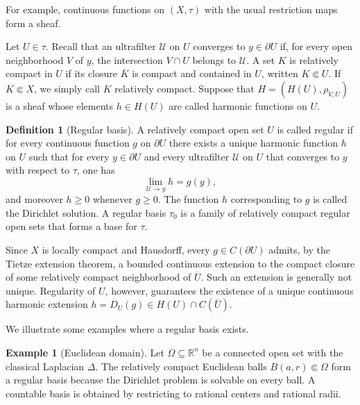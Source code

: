 \documentclass{amsart}
\theoremstyle{definition}
\newtheorem{definition}{Definition}[section]
\newtheorem{example}{Example}[section]
\theoremstyle{remark}
\newtheorem{remark}[definition]{Remark}
\numberwithin{equation}{section}
\begin{document}
	
	
	For example, continuous functions on $(X,\tau)$ with the usual restriction maps form a sheaf.
	
	
	Let $U\in\tau$. Recall that an ultrafilter $\mathscr U$ on $U$ converges to $y\in\partial U$ if, for every open neighborhood $V$ of $y$, the intersection $V\cap U$ belongs to $\mathscr U$. A set $K$ is relatively compact in $U$ if its closure $\overline K$ is compact and contained in $U$, written $K\Subset U$. If $K\Subset X$, we simply call $K$ relatively compact. Suppose that $H=(H(U),\rho_{V,U})$ is a sheaf whose elements $h\in H(U)$ are called harmonic functions on $U$.
	
	\begin{definition}[Regular basis]
		A relatively compact open set $U$ is called regular if for every continuous function $g$ on $\partial U$ there exists a unique harmonic function $h$ on $U$ such that for every $y\in\partial U$ and every ultrafilter $\mathscr{U}$ on $U$ that converges to $y$ with respect to $\tau$, one has
		$$
		\lim_{\mathscr{U}\to y} h = g(y),
		$$
		and moreover $h\ge0$ whenever $g\ge0$. The function $h$ corresponding to $g$ is called the Dirichlet solution. A regular basis $\tau_0$ is a family of relatively compact regular open sets that forms a base for $\tau$.
	\end{definition}
	
	Since $X$ is locally compact and Hausdorff, every
	$g\in C(\partial U)$ admits, by the Tietze extension theorem, a
	bounded continuous extension to the compact closure of some relatively compact neighborhood of $\overline U$. Such an extension is generally not unique. Regularity of $U$, however, guarantees the existence of a unique continuous harmonic extension
	$h=D_U(g)\in H(U)\cap C(\overline U)$.
	
	We illustrate some examples where a regular basis exists.
	
	
	
	\begin{example}[Euclidean domain]\label{example1}
		Let $\Omega\subseteq\mathbb R^n$ be a connected open set with the classical Laplacian $\Delta$. The relatively compact Euclidean balls $B(a,r)\Subset\Omega$ form a regular basis because the Dirichlet problem is solvable on every ball.
		A countable basis is obtained by restricting to rational centers and rational radii.
	\end{example}
	
\end{document}

